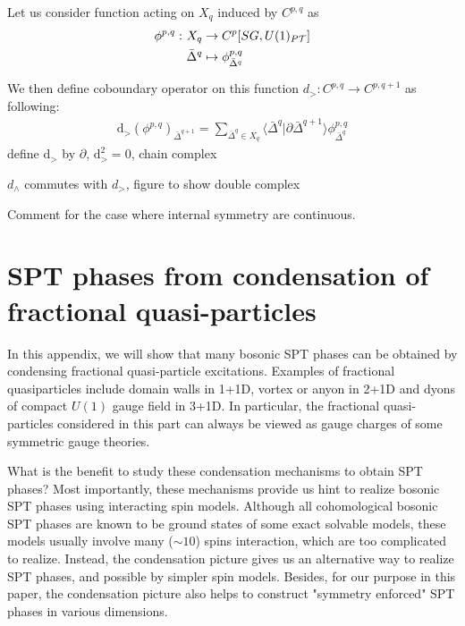 \documentclass[%
  reprint,
  amsmath,amssymb,
  aps,pra,
]{revtex4-1}
\newcommand{\dd}{\mathrm{d}} %
\newcommand{\TT}{\mathcal{T}} %
\newcommand{\bDelta}{\bar{\Delta}}
\begin{document}
\begin{enumerate}
    Let us consider function acting on $X_q$ induced by $C^{p,q}$ as
    \begin{align}
      \phi^{p,q}:~& X_q\rightarrow C^p[SG,U(1)_{P\TT}]\notag\\
      &\bar{\Delta}^q\mapsto\phi^{p,q}_{\bar{\Delta}^q}
      \label{}
    \end{align}

    We then define coboundary operator on this function $d_>:C^{p,q}\rightarrow C^{p,q+1}$ as following:
    \begin{align}
      \dd_>\left(\phi^{p,q}\right)_{\bar{\Delta}^{q+1}}=\sum_{\bDelta^{q}\in X_{q}}\langle\bDelta^q|\partial\bDelta^{q+1}\rangle \phi^{p,q}_{\bDelta^{q}}
    \end{align}
    {\color{red} define $\dd_>$ by $\partial$, $\dd_>^2=0$, chain complex}
\end{enumerate}

{\color{red} $d_\wedge$ commutes with $d_>$, figure to show double complex}


{\color{red} Comment for the case where internal symmetry are continuous.}

\section{SPT phases from condensation of fractional quasi-particles}\label{app:SPT_condensation}
In this appendix, we will show that many bosonic SPT phases can be obtained by condensing fractional quasi-particle excitations.
Examples of fractional quasiparticles include domain walls in 1+1D, vortex or anyon in 2+1D and dyons of compact $U(1)$ gauge field in 3+1D.
In particular, the fractional quasi-particles considered in this part can always be viewed as gauge charges of some symmetric gauge theories.

What is the benefit to study these condensation mechanisms to obtain SPT phases?
Most importantly, these mechanisms provide us hint to realize bosonic SPT phases using interacting spin models.
Although all cohomological bosonic SPT phases are known to be ground states of some exact solvable models, these models usually involve many ($\sim 10$) spins interaction, which are too complicated to realize.
Instead, the condensation picture gives us an alternative way to realize SPT phases, and possible by simpler spin models.
Besides, for our purpose in this paper, the condensation picture also helps to construct "symmetry enforced" SPT phases in various dimensions.
\end{document}

